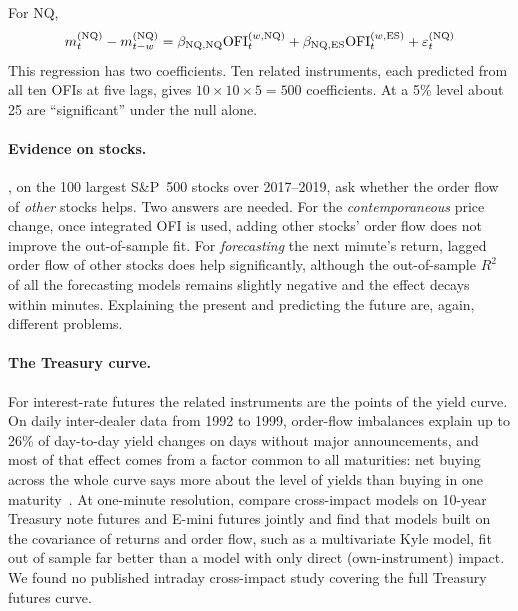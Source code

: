 \begin{example}
For NQ,
\[
  m^{(\text{NQ})}_t - m^{(\text{NQ})}_{t-w} = \beta_{\text{NQ},\text{NQ}}\mathrm{OFI}^{(w,\text{NQ})}_t +
  \beta_{\text{NQ},\text{ES}}\mathrm{OFI}^{(w,\text{ES})}_t + \varepsilon^{(\text{NQ})}_t
\]
This regression has two coefficients. Ten related instruments, each predicted from all ten OFIs at five lags, gives
$10 \times 10 \times 5 = 500$ coefficients. At a 5\% level about 25 are ``significant'' under the
null alone.
\end{example}

\paragraph{Evidence on stocks.} \citet{contcucuringu2023}, on the 100 largest S\&P~500 stocks over 2017--2019, ask whether the order flow of
\emph{other} stocks helps. Two answers are needed. For the
\emph{contemporaneous} price change, once integrated OFI is used, adding other stocks' order flow
does not improve the out-of-sample fit. For \emph{forecasting} the next minute's return, lagged
order flow of other stocks does help significantly, although the out-of-sample $R^2$ of all the
forecasting models remains slightly negative and the effect decays within minutes. Explaining the
present and predicting the future are, again, different problems.

\paragraph{The Treasury curve.} For interest-rate futures the related instruments are the points of the
yield curve. On daily inter-dealer data from 1992 to 1999, order-flow imbalances explain up to 26\% of
day-to-day yield changes on days without major announcements, and most of that effect comes from a
factor common to all maturities: net buying across the whole curve says more about the level of yields
than buying in one maturity~\citep{brandt2004}. At one-minute resolution, \citet{tomas2022} compare
cross-impact models on 10-year Treasury note futures and E-mini futures jointly and find that
models built on the covariance of returns and order flow, such as a multivariate Kyle model, fit out of
sample far better than a model with only direct (own-instrument) impact. We found no published
intraday cross-impact study covering the full Treasury futures curve.

